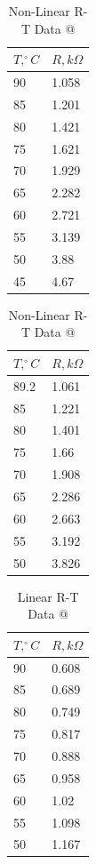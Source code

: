 \documentclass[a4,11pt]{article}
\makeatletter
\newcommand*{\rom}[1]{\expandafter\@slowromancap\romannumeral #1@}
\makeatother
\begin{document}
\begin{table}
  \centering
  \caption{Non-Linear R-T Data \rom{2}}
\begin{tabular}{l|l}
  \hline
  $T, ^{\circ}C$ & $R, k\Omega$ \\
  \hline
  90 & 1.058  \\
  85 & 1.201  \\
  80 & 1.421  \\
  75 & 1.621  \\
  70 & 1.929  \\
  65 & 2.282  \\
  60 & 2.721  \\
  55 & 3.139  \\
  50 & 3.88  \\
  45 & 4.67  \\
\end{tabular}
\end{table}

\begin{table}
  \centering
  \caption{Non-Linear R-T Data \rom{3}}
\begin{tabular}{l|l}
  \hline
  $T, ^{\circ}C$ & $R, k\Omega$ \\
  \hline
  89.2 & 1.061  \\
  85 & 1.221  \\
  80 & 1.401  \\
  75 & 1.66  \\
  70 & 1.908  \\
  65 & 2.286  \\
  60 & 2.663  \\
  55 & 3.192  \\
  50 & 3.826  \\
  \hline
\end{tabular}
\end{table}

\begin{table}
  \centering
  \caption{Linear R-T Data \rom{1}}
\begin{tabular}{l|l}
  \hline
  $T, ^{\circ}C$ & $R, k\Omega$ \\
  \hline
  90 & 0.608  \\
  85 & 0.689  \\
  80 & 0.749  \\
  75 & 0.817  \\
  70 & 0.888  \\
  65 & 0.958  \\
  60 & 1.02  \\
  55 & 1.098  \\
  50 & 1.167  \\
\end{tabular}
\end{table}
\end{document}
